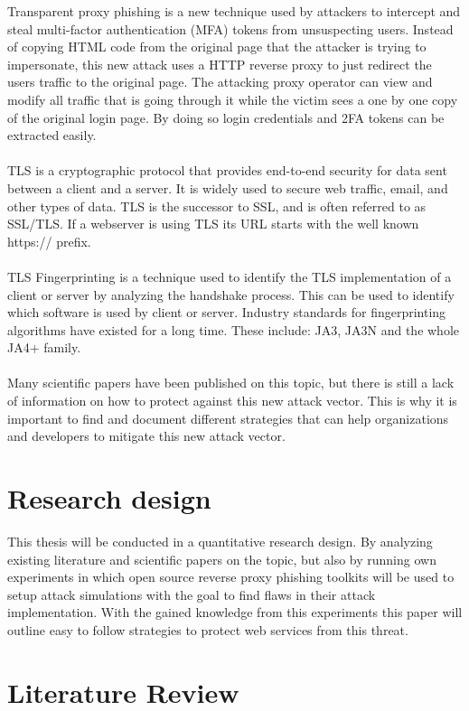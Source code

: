 \documentclass [14pt]{extarticle}
\begin{document}
Transparent proxy phishing is a new technique used by attackers to intercept and steal multi-factor authentication (MFA) tokens from unsuspecting users. Instead of copying HTML code from the original page that the attacker is trying to impersonate, this new attack uses a HTTP reverse proxy to just redirect the users traffic to the original page. The attacking proxy operator can view and modify all traffic that is going through it while the victim sees a one by one copy of the original login page. By doing so login credentials and 2FA tokens can be extracted easily. \\ \\
TLS is a cryptographic protocol that provides end-to-end security for data sent between a client and a server. It is widely used to secure web traffic, email, and other types of data. TLS is the successor to SSL, and is often referred to as SSL/TLS. If a webserver is using TLS its URL starts with the well known https:// prefix. \\ \\
TLS Fingerprinting is a technique used to identify the TLS implementation of a client or server by analyzing the handshake process. This can be used to identify which software is used by client or server. Industry standards for fingerprinting algorithms have existed for a long time. These include: JA3, JA3N and the whole JA4+ family. \\ \\

Many scientific papers have been published on this topic, but there is still a lack of information on how to protect against this new attack vector. This is why it is important to find and document different strategies that can help organizations and developers to mitigate this new attack vector.

\section{Research design}
This thesis will be conducted in a quantitative research design. By analyzing existing literature and scientific papers on the topic, but also by running own experiments in which open source reverse proxy phishing toolkits will be used to setup attack simulations with the goal to find flaws in their attack implementation. With the gained knowledge from this experiments this paper will outline easy to follow strategies to protect web services from this threat.

\newpage
\section{Literature Review}
\end{document}

